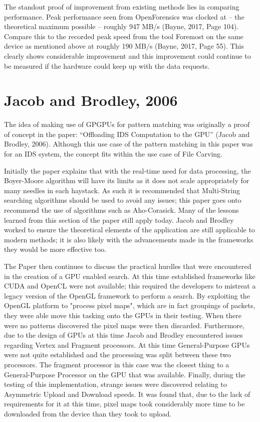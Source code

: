The standout proof of improvement from existing methods lies in comparing performance. Peak performance seen from OpenForensics was clocked at -- the theoretical maximum possible -- roughly 947 \ac{MB}/s (Bayne, 2017, Page 104).
Compare this to the recorded peak speed from the tool Foremost on the same device as mentioned above at roughly 190 \ac{MB}/s (Bayne, 2017, Page 55).
This clearly shows considerable improvement and this improvement could continue to be measured if the hardware could keep up with the data requests.

\section*{Jacob and Brodley, 2006}
The idea of making use of \ac{GPGPU}s for pattern matching was originally a proof of concept in the paper: ``Offloading \ac{IDS} Computation to the \ac{GPU}'' (Jacob and Brodley, 2006).
Although this use case of the pattern matching in this paper was for an \ac{IDS} system, the concept fits within the use case of File Carving.

Initially the paper explains that with the real-time need for data processing, the Boyer-Moore algorithm will have its limits as it does not scale appropriately for many needles in each haystack.
As such it is recommended that Multi-String searching algorithms should be used to avoid any issues; this paper goes onto recommend the use of algorithms such as Aho-Corasick.
Many of the lessons learned from this section of the paper still apply today.
Jacob and Brodley worked to ensure the theoretical elements of the application are still applicable to modern methods; it is also likely with the advancements made in the frameworks they would be more effective too.

The Paper then continues to discuss the practical hurdles that were encountered in the creation of a \ac{GPU} enabled search.
At this time established frameworks like CUDA and OpenCL were not available; this required the developers to mistreat a legacy version of the OpenGL framework to perform a search.
By exploiting the OpenGL platform to "process pixel maps", which are in fact groupings of packets, they were able move this tasking onto the \ac{GPU}s in their testing.
When there were no patterns discovered the pixel maps were then discarded.
Furthermore, due to the design of \ac{GPU}s at this time Jacob and Brodley encountered issues regarding Vertex and Fragment processors.
At this time General-Purpose \ac{GPU}s were not quite established and the processing was split between these two processors.
The fragment processor in this case was the closest thing to a General-Purpose Processor on the \ac{GPU} that was available.
Finally, during the testing of this implementation, strange issues were discovered relating to Asymmetric Upload and Download speeds.
It was found that, due to the lack of requirements for it at this time, pixel maps took considerably more time to be downloaded from the device than they took to upload.
